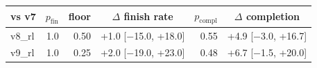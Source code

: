 \begin{tabular}{@{}lrrcrc@{}}
\toprule
vs v7 & $p_{\mathrm{fin}}$ & floor & $\Delta$ finish rate & $p_{\mathrm{compl}}$ & $\Delta$ completion \\
\midrule
v8\_rl & 1.0 & 0.50 & +1.0 [$-$15.0, +18.0] & 0.55 & +4.9 [$-$3.0, +16.7] \\
v9\_rl & 1.0 & 0.25 & +2.0 [$-$19.0, +23.0] & 0.48 & +6.7 [$-$1.5, +20.0] \\
\bottomrule
\end{tabular}
